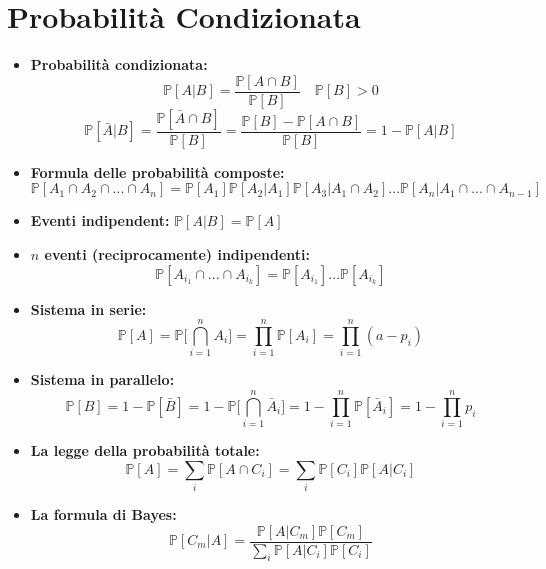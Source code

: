\chapter{Probabilità Condizionata}
\begin{itemize}
    \item \textbf{Probabilità condizionata:}
    \[\mathbb{P}[A|B] = \frac{\mathbb{P}[A \cap B]}{\mathbb{P}[B]} \quad \mathbb{P}[B] > 0\]
    \[\mathbb{P}[\bar{A} | B] = \frac{\mathbb{P}[\bar{A} \cap B]}{\mathbb{P}[B]} = \frac{\mathbb{P}[B] - \mathbb{P}[A \cap B]}{\mathbb{P}[B]} = 1 - \mathbb{P}[A | B]\]
    \item \textbf{Formula delle probabilità composte:}
    \[\mathbb{P}[A_1 \cap A_2 \cap ... \cap A_n] = \mathbb{P}[A_1]\mathbb{P}[A_2 | A_1]\mathbb{P}[A_3|A_1 \cap A_2] ... \mathbb{P}[A_n | A_1 \cap ... \cap A_{n-1}]\]
    \item \textbf{Eventi indipendent:} \(\mathbb{P}[A | B] = \mathbb{P}[A]\)
    \item \textbf{\(n\) eventi (reciprocamente) indipendenti:}
    \[\mathbb{P}[A_{i_1} \cap ... \cap A_{i_k}] = \mathbb{P}[A_{i_1}] ... \mathbb{P}[A_{i_k}]\]
    \item \textbf{Sistema in serie:}
    \[\mathbb{P}[A] = \mathbb{P}\Bigg[ \bigcap_{i=1}^nA_i\Bigg] = \prod_{i=1}^n \mathbb{P}[A_i] = \prod_{i=1}^n(a-p_i)\]
    \item \textbf{Sistema in parallelo:}
    \[\mathbb{P}[B] = 1 - \mathbb{P}[\bar{B}] = 1 - \mathbb{P}\Bigg[\bigcap_{i=1}^n\bar{A}_i\Bigg] = 1- \prod_{i=1}^n\mathbb{P}[\bar{A}_i] = 1-\prod_{i=1}^n p_i\]
    \item \textbf{La legge della probabilità totale:}
    \[\mathbb{P}[A] = \sum_i \mathbb{P}[A \cap C_i] = \sum_i \mathbb{P}[C_i]\mathbb{P}[A|C_i]\]
    \item \textbf{La formula di Bayes:}
    \[\mathbb{P}[C_m|A] = \frac{\mathbb{P}[A|C_m]\mathbb{P}[C_m]}{\sum_i\mathbb{P}[A|C_i]\mathbb{P}[C_i]}\]
\end{itemize}